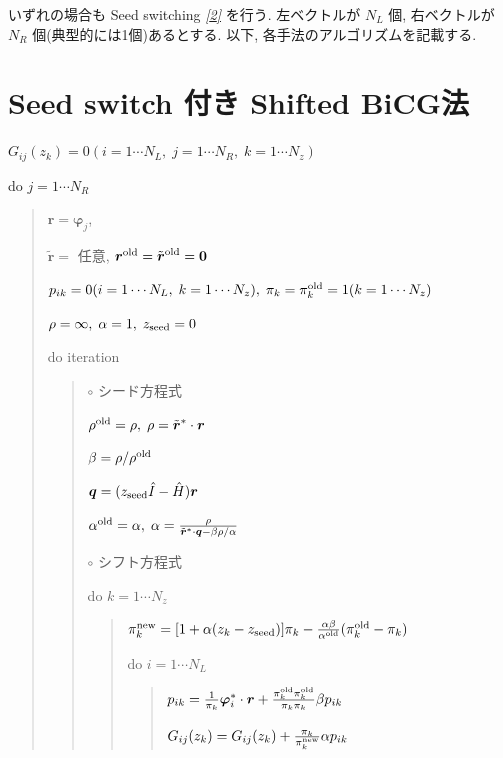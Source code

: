 \documentclass[letterpaper,10pt,dvipdfmx,openany]{sphinxmanual}
\begin{document}
いずれの場合も Seed switching {\hyperref[komega_ref_ja:ref]{\emph{{[}2{]}}}} を行う. 左ベクトルが \(N_L\) 個,
右ベクトルが \(N_R\) 個(典型的には1個)あるとする. 以下,
各手法のアルゴリズムを記載する.


\section{Seed switch 付き Shifted BiCG法}
\label{komega_algorithm_ja:seed-switch-shifted-bicg}
\(G_{i j}(z_k) = 0 (i=1 \cdots N_L,\; j = 1 \cdots N_R,\; k=1 \cdots N_z)\)

do \(j = 1 \cdots N_R\)
\begin{quote}

\({\boldsymbol r} = {\boldsymbol \varphi_j}\),

\({\tilde {\boldsymbol r}} =\) 任意,
\({\boldsymbol r}^{\rm old} = {\tilde {\boldsymbol r}}^{\rm old} = {\bf 0}\)

\(p_{i k} = 0(i=1 \cdots N_L,\; k=1 \cdots N_z),\; \pi_k=\pi_k^{\rm old} = 1(k=1 \cdots N_z)\)

\(\rho = \infty,\; \alpha = 1,\; z_{\rm seed}=0\)

do iteration
\begin{quote}

\(\circ\) シード方程式

\(\rho^{\rm old} = \rho,\; \rho = {\tilde {\boldsymbol r}}^* \cdot {\boldsymbol r}\)

\(\beta = \rho / \rho^{\rm old}\)

\({\boldsymbol q} = (z_{\rm seed} {\hat I} - {\hat H}){\boldsymbol r}\)

\(\alpha^{\rm old} = \alpha,\; \alpha = \frac{\rho}{{\tilde {\boldsymbol r}}^*\cdot{\boldsymbol q} - \beta \rho / \alpha }\)

\(\circ\) シフト方程式

do \(k = 1 \cdots N_z\)
\begin{quote}

\(\pi_k^{\rm new} = [1+\alpha(z_k-z_{\rm seed})]\pi_k - \frac{\alpha \beta}{\alpha^{\rm old}}(\pi_k^{\rm old} - \pi_k)\)

do \(i = 1 \cdots N_L\)
\begin{quote}

\(p_{i k} = \frac{1}{\pi_k} {\boldsymbol \varphi}_i^* \cdot {\boldsymbol r} + \frac{\pi^{\rm old}_k \pi^{\rm old}_k}{\pi_k \pi_k} \beta p_{i k}\)

\(G_{i j}(z_k) = G_{i j}(z_k) + \frac{\pi_k}{\pi_k^{\rm new}} \alpha p_{i k}\)


\end{quote}
\end{quote}
\end{quote}
\end{quote}
\end{document}
